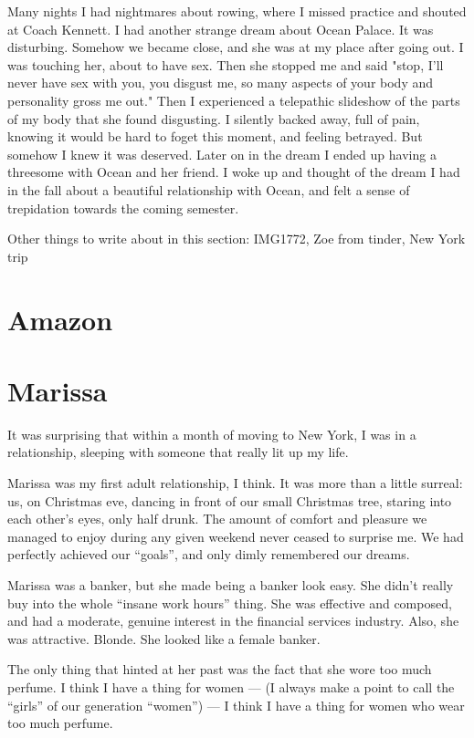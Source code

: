 \documentclass[12pt]{article}
\begin{document}
Many nights I had nightmares about rowing, where I missed practice and shouted
at Coach Kennett.  I had another strange dream about Ocean Palace.  It was
disturbing.  Somehow we became close, and she was at my place after going out.
I was touching her, about to have sex.  Then she stopped me and said "stop, I'll
never have sex with you, you disgust me, so many aspects of your body and
personality gross me out."  Then I experienced a telepathic slideshow of the
parts of my body that she found disgusting.  I silently backed away, full of
pain, knowing it would be hard to foget this moment, and feeling betrayed. But
somehow I knew it was deserved.  Later on in the dream I ended up having a
threesome with Ocean and her friend.  I woke up and thought of the dream I had
in the fall about a beautiful relationship with Ocean, and felt a sense of
trepidation towards the coming semester.

Other things to write about in this section: IMG1772, Zoe from tinder, New York
trip

\section{Amazon}



\section{Marissa}
It was surprising that within a month of moving to New York, I was in a
relationship, sleeping with someone that really lit up my life.

Marissa was my first adult relationship, I think.  It was more than a little
surreal: us, on Christmas eve, dancing in front of our small Christmas tree,
staring into each other's eyes, only half drunk.  The amount of comfort and
pleasure we managed to enjoy during any given weekend never ceased to surprise
me.  We had perfectly achieved our ``goals'', and only dimly remembered our
dreams.

Marissa was a banker, but she made being a banker look easy.  She didn't really
buy into the whole ``insane work hours'' thing.  She was effective and composed,
and had a moderate, genuine interest in the financial services industry.  Also,
she was attractive.  Blonde.  She looked like a female banker. 

The only thing that hinted at her past was the fact that she wore too much
perfume.  I think I have a thing for women --- (I always make a point to call
the ``girls'' of our generation ``women'') --- I think I have a thing for women
who wear too much perfume.
\end{document}
